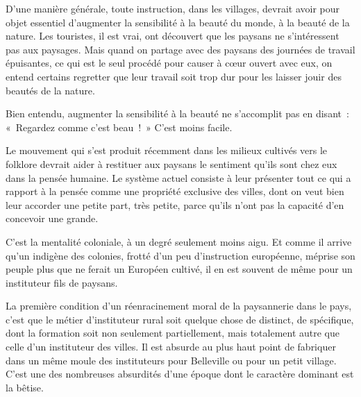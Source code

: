 \documentclass[french,twoside]{book} %
\begin{document}
D'une manière générale, toute instruction, dans les villages, devrait avoir pour objet essentiel d'augmenter la sensibilité à la beauté du monde, à la beauté de la nature. Les touristes, il est vrai, ont découvert que les paysans ne s'intéressent pas aux paysages. Mais quand on partage avec des paysans des journées de travail épuisantes, ce qui est le seul procédé pour causer à cœur ouvert avec eux, on entend certains regretter que leur travail soit trop dur pour les laisser jouir des beautés de la nature.\par
Bien entendu, augmenter la sensibilité à la beauté ne s'accomplit pas en disant : « Regardez comme c'est beau ! » C'est moins facile.\par
Le mouvement qui s'est produit récemment dans les milieux cultivés vers le folklore devrait aider à restituer aux paysans le sentiment qu'ils sont chez eux dans la pensée humaine. Le système actuel consiste à leur présenter tout ce qui a rapport à la pensée comme une propriété exclusive des villes, dont on veut bien leur accorder une petite part, très petite, parce qu'ils n'ont pas la capacité d'en concevoir une grande.\par
C'est la mentalité coloniale, à un degré seulement moins aigu. Et comme il arrive qu'un indigène des colonies, frotté d'un peu d'instruction européenne, méprise son peuple plus que ne ferait un Européen cultivé, il en est souvent de même pour un instituteur fils de paysans.\par
La première condition d'un réenracinement moral de la paysannerie dans le pays, c'est que le métier d'instituteur rural soit quelque chose de distinct, de spécifique, dont la formation soit non seulement partiellement, mais totalement autre que celle d'un instituteur des villes. Il est absurde au plus haut point de fabriquer dans un même moule des instituteurs pour Belleville ou pour un petit village. C'est une des nombreuses absurdités d'une époque dont le caractère dominant est la bêtise.\par
\end{document}
